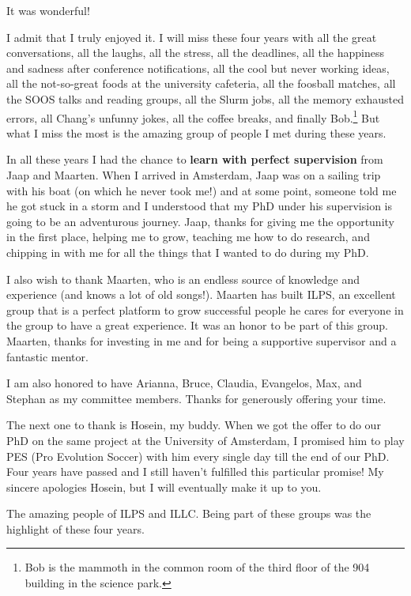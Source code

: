\acknowledgments

It was wonderful! 

I admit that I truly enjoyed it. I will miss these four years with all the great conversations, all the laughs, all the stress, all the deadlines, all the happiness and sadness after conference notifications,  all the cool but never working ideas, all the not-so-great foods at the university cafeteria, all the foosball matches, all the SOOS talks and reading groups, all the Slurm jobs, all the memory exhausted errors, all Chang's unfunny jokes, all the coffee breaks, and finally Bob.\footnote{Bob is the mammoth in the common room of the third floor of the 904 building in the science park.} But what I miss the most is the amazing group of people I met during these years.

In all these years I had the chance to \textbf{learn with perfect supervision} from Jaap and Maarten. 
When I arrived in Amsterdam, Jaap was on a sailing trip with his boat (on which he never took me!) and at some point, someone told me he got stuck in a storm and I understood that my PhD under his supervision is going to be an adventurous journey. Jaap, thanks for giving me the opportunity in the first place, helping me to grow, teaching me how to do research, and chipping in with me for all the things that I wanted to do during my PhD. 

I also wish to thank Maarten, who is an endless source of knowledge and experience (and knows a lot of old songs!). Maarten has built ILPS,  an excellent group that is a perfect platform to grow successful people he cares for everyone in the group to have a great experience. It was an honor to be part of this group. Maarten, thanks for investing in me and for being a supportive supervisor and a fantastic mentor. 

I am also honored to have Arianna, Bruce, Claudia, Evangelos, Max, and Stephan as my committee members. Thanks for generously offering your time.

The next one to thank is Hosein, my buddy. When we got the offer to do our PhD on the same project at the University of Amsterdam, I promised him to play PES (Pro Evolution Soccer) with him every single day till the end of our PhD. Four years have passed and I still haven't fulfilled this particular promise!  My sincere apologies Hosein, but I will eventually make it up to you.

The amazing people of ILPS and ILLC. Being part of these groups was the highlight of these four years. 

